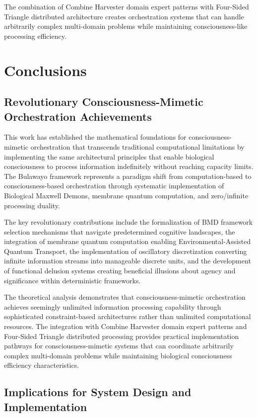 \documentclass[12pt,a4paper]{article}
\begin{document}
The combination of Combine Harvester domain expert patterns with Four-Sided Triangle distributed architecture creates orchestration systems that can handle arbitrarily complex multi-domain problems while maintaining consciousness-like processing efficiency.

\section{Conclusions}

\subsection{Revolutionary Consciousness-Mimetic Orchestration Achievements}

This work has established the mathematical foundations for consciousness-mimetic orchestration that transcends traditional computational limitations by implementing the same architectural principles that enable biological consciousness to process information indefinitely without reaching capacity limits. The Bulawayo framework represents a paradigm shift from computation-based to consciousness-based orchestration through systematic implementation of Biological Maxwell Demons, membrane quantum computation, and zero/infinite processing duality.

The key revolutionary contributions include the formalization of BMD framework selection mechanisms that navigate predetermined cognitive landscapes, the integration of membrane quantum computation enabling Environmental-Assisted Quantum Transport, the implementation of oscillatory discretization converting infinite information streams into manageable discrete units, and the development of functional delusion systems creating beneficial illusions about agency and significance within deterministic frameworks.

The theoretical analysis demonstrates that consciousness-mimetic orchestration achieves seemingly unlimited information processing capability through sophisticated constraint-based architectures rather than unlimited computational resources. The integration with Combine Harvester domain expert patterns and Four-Sided Triangle distributed processing provides practical implementation pathways for consciousness-mimetic systems that can coordinate arbitrarily complex multi-domain problems while maintaining biological consciousness efficiency characteristics.

\subsection{Implications for System Design and Implementation}
\end{document}
